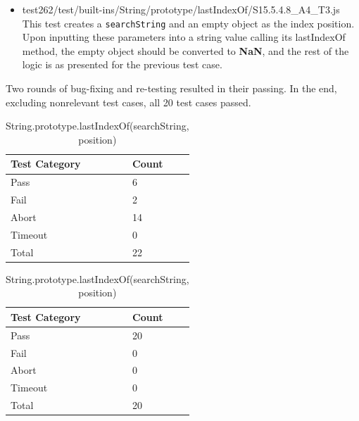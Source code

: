\documentclass[a4paper,11pt,twoside]{report}
\def\jsinline{\lstinline[language=JavaScript, basicstyle=\small]}%\end{lstlisting}
\begin{document}
\begin{itemize}
\begin{itemize}
\item test262/test/built-ins/String/prototype/lastIndexOf/S15.5.4.8\_A4\_T3.js \\
This test creates a \jsinline|searchString| and an empty object as the index position. Upon inputting these parameters into a string value calling its lastIndexOf method, the empty object should be converted to \textbf{NaN}, and the rest of the logic is as presented for the previous test case.
\end{itemize}
Two rounds of bug-fixing and re-testing resulted in their passing. In the end, excluding nonrelevant test cases, all 20 test cases passed.
\begin{table}[ht!]
\centering
\begin{subtable}{0.5\textwidth}
\centering
\begin{tabular}{|p{3cm}|p{2cm}|} \hline
\textbf{Test Category} & \textbf{Count} \\ \hline
Pass & 6 \\
Fail & 2 \\
Abort & 14 \\
Timeout & 0 \\
Total & 22 \\ \hline
\end{tabular}
\caption{Before Implementation}
\end{subtable}%
\begin{subtable}{0.5\textwidth}
\centering
\begin{tabular}{|p{3cm}|p{2cm}|} \hline
\textbf{Test Category} & \textbf{Count} \\ \hline
Pass & 20 \\
Fail & 0 \\
Abort & 0 \\
Timeout & 0 \\
Total & 20 \\ \hline
\end{tabular}
\caption{After two rounds of implementations}
\end{subtable}
\caption{String.prototype.lastIndexOf(searchString, position)}
\end{table}


\end{itemize}
\end{document}
